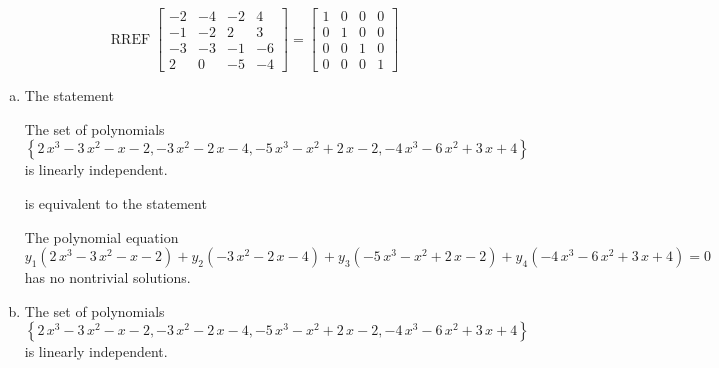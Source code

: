 \begin{exerciseAnswer} 


\[\operatorname{RREF} \left[\begin{array}{cccc}
-2 & -4 & -2 & 4 \\
-1 & -2 & 2 & 3 \\
-3 & -3 & -1 & -6 \\
2 & 0 & -5 & -4
\end{array}\right] = \left[\begin{array}{cccc}
1 & 0 & 0 & 0 \\
0 & 1 & 0 & 0 \\
0 & 0 & 1 & 0 \\
0 & 0 & 0 & 1
\end{array}\right] \]


\begin{enumerate}[(a)]
\item The statement 
\begin{center}\begin{minipage}{0.8\textwidth}
 The set of polynomials \( \left\{ 2 \, x^{3} - 3 \, x^{2} - x - 2 , -3 \, x^{2} - 2 \, x - 4 , -5 \, x^{3} - x^{2} + 2 \, x - 2 , -4 \, x^{3} - 6 \, x^{2} + 3 \, x + 4 \right\} \) is linearly independent.
\end{minipage}\end{center}
     is equivalent to the statement 
\begin{center}\begin{minipage}{0.8\textwidth}
 The polynomial equation \[ y_{1} \left( 2 \, x^{3} - 3 \, x^{2} - x - 2 \right) + y_{2} \left( -3 \, x^{2} - 2 \, x - 4 \right) + y_{3} \left( -5 \, x^{3} - x^{2} + 2 \, x - 2 \right) + y_{4} \left( -4 \, x^{3} - 6 \, x^{2} + 3 \, x + 4 \right) = 0 \] has no nontrivial solutions. 
\end{minipage}\end{center}
    
\item The set of polynomials \( \left\{ 2 \, x^{3} - 3 \, x^{2} - x - 2 , -3 \, x^{2} - 2 \, x - 4 , -5 \, x^{3} - x^{2} + 2 \, x - 2 , -4 \, x^{3} - 6 \, x^{2} + 3 \, x + 4 \right\} \)is linearly independent.
\end{enumerate}
    
\end{exerciseAnswer}
    
